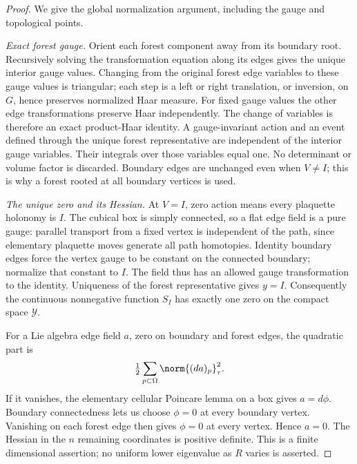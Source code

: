 \begin{proof}
We give the global normalization argument, including the gauge and
topological points.

\emph{Exact forest gauge.}
Orient each forest component away from its boundary root. Recursively
solving the transformation equation along its edges gives the unique
interior gauge values. Changing from the original forest edge variables
to these gauge values is triangular; each step is a left or right
translation, or inversion, on \(G\), hence preserves normalized Haar
measure. For fixed gauge values the other edge transformations preserve
Haar independently. The change of variables is therefore an exact
product-Haar identity. A gauge-invariant action and an event defined
through the unique forest representative are independent of the
interior gauge variables. Their integrals over those variables equal
one. No determinant or volume factor is discarded. Boundary edges
are unchanged even when \(V\ne I\); this is why a forest rooted at
all boundary vertices is used.

\emph{The unique zero and its Hessian.}
At \(V=I\), zero action means every plaquette holonomy is \(I\).
The cubical box is simply connected, so a flat edge field is a pure
gauge: parallel transport from a fixed vertex is independent of the
path, since elementary plaquette moves generate all path homotopies.
Identity boundary edges force the vertex gauge to be constant on the
connected boundary; normalize that constant to \(I\). The field
thus has an allowed gauge transformation to the identity. Uniqueness
of the forest representative gives \(y=I\). Consequently the
continuous nonnegative function \(S_I\) has exactly one zero on the
compact space \(\mathcal Y\).

For a Lie algebra edge field \(a\), zero on boundary and forest edges,
the quadratic part is
\[
 \tfrac12\sum_{p\subset\Omega}\norm{(da)_p}_\tau^2.
\]
If it vanishes, the elementary cellular Poincare lemma on a box gives
\(a=d\phi\). Boundary connectedness lets us choose \(\phi=0\) at
every boundary vertex. Vanishing on each forest edge then gives
\(\phi=0\) at every vertex. Hence \(a=0\). The Hessian in the \(n\)
remaining coordinates is positive definite. This is a finite
dimensional assertion; no uniform lower eigenvalue as \(R\) varies
is asserted.


\end{proof}
